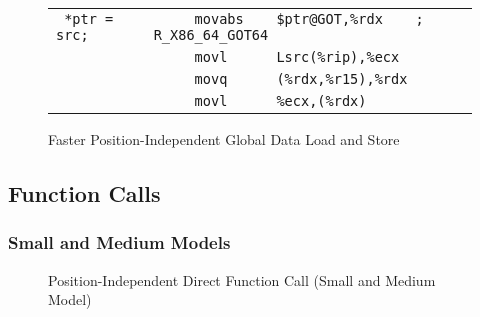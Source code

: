 \begin{figure}[H]
\Hrule
\caption{Faster Position-Independent Global Data Load and Store}
\label{large_rip_rel_addr_pic}
\begin{center}
\begin{footnotesize}
\begin{tabular}{|l|l|}
\hline
\verb# *ptr = src; # & \verb#     movabs    $ptr@GOT,%rdx    ; R_X86_64_GOT64 # \\
\verb#             # & \verb#     movl      Lsrc(%rip),%ecx  # \\
\verb#             # & \verb#     movq      (%rdx,%r15),%rdx # \\
\verb#             # & \verb#     movl      %ecx,(%rdx)      # \\
\hline
\end{tabular} %
\end{footnotesize}
\end{center}
\end{figure}

\subsection{Function Calls}

\subsubsection{Small and Medium Models}

\begin{figure}[H]
\Hrule
\caption{Position-Independent Direct Function Call (Small and Medium Model)}
\begin{center}
\end{center}
\Hrule
\end{figure}

